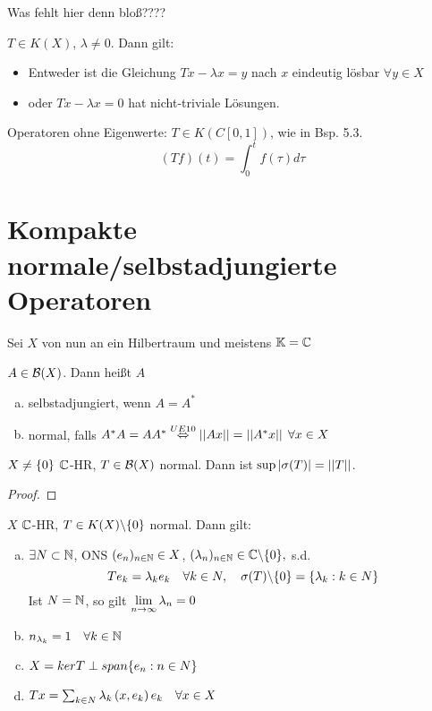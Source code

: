 	Was fehlt hier denn bloß???? \todor[Es fehlen 14-17]
	\setcounter{thm}{17}
	\begin{cor}
		$T\in K(X)$, $\lambda \neq 0$. Dann gilt: 
			\begin{itemize}[]
				\item Entweder ist die Gleichung $Tx - \lambda x = y$ nach $x$ eindeutig lösbar $\forall y\in X$
				\item oder $Tx - \lambda x = 0$ hat nicht-triviale Lösungen.
			\end{itemize}
	\end{cor}
	
	\begin{bem}[Beispiel]
		Operatoren ohne Eigenwerte: $T\in K(C[0,1])$, wie in Bsp. 5.3.
			$$ (Tf)(t) = \int_0^t f(\tau)d\tau$$
	\end{bem}

	\section{Kompakte normale/selbstadjungierte Operatoren}
	Sei $X$ von nun an ein Hilbertraum und meistens $\K = \C$

	\begin{definition}
		$A \in \BS[X]$. Dann heißt $A$ 
			\begin{enumerate}[a)]
				\item selbstadjungiert, wenn $A = A^*$
				\item normal, falls $A^* A = A A^* \aq[UE10] \norm{Ax} = \norm{A^* x} \; \forall x \in X$ 
			\end{enumerate}
	\end{definition}
	
	\begin{lemma}
		$X \neq \set{0}$ $\C$-HR, $T\in \BS[X]$ normal. Dann ist $\sup|\sigma(T)| = \norm{T}$.
	\end{lemma}

	\begin{proof}
		\todor	
	\end{proof}

		
	\begin{thm}
		$X$ $\C$-HR, $T\in K(X)\backslash\set{0}$ normal. Dann gilt:
			\begin{enumerate}[a)]
				\item $\exists N\subset \N$, ONS $\ff{e}{n}{\N} \in X$, $\ff{\lambda}{n}{\N}\in \C\backslash\set{0},$ s.d. 
				$$ T e_k = \lambda_k e_k \quad \forall k\in N, \quad \sigma(T)\backslash\set{0} = \set{\lambda_k: k \in N}$$
				Ist $N = \N$, so gilt $\disp \limes \lambda_n = 0$
				\item $n_{\lambda_k} = 1 \quad \forall k\in\N$
				\item $X = ker T \perp span\set{e_n : n\in N}$
				\item $Tx = \sum_{k\in N} \lambda_k \Sp{x,e_k} e_k \quad \forall x \in X$
			\end{enumerate}
	\end{thm}
	
